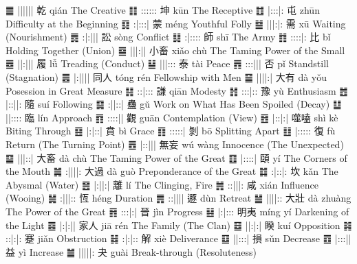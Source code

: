  {䷀} {||||||} {乾}   {qián}      {The Creative}
 {䷁} {::::::} {坤}   {kūn}       {The Receptive}
 {䷂} {|:::|:} {屯}   {zhūn}      {Difficulty at the Beginning}
 {䷃} {:|:::|} {蒙}   {méng}      {Youthful Folly}
 {䷄} {|||:|:} {需}   {xū}        {Waiting (Nourishment)}
 {䷅} {:|:|||} {訟}   {sòng}      {Conflict}
 {䷆} {:|::::} {師}   {shī}       {The Army}
 {䷇} {::::|:} {比}   {bǐ}        {Holding Together (Union)}
 {䷈} {|||:||} {小畜} {xiǎo chù}  {The Taming Power of the Small}
 {䷉} {||:|||} {履}   {lǚ}        {Treading (Conduct)}
 {䷊} {|||:::} {泰}   {tài}       {Peace}
 {䷋} {:::|||} {否}   {pǐ}        {Standstill (Stagnation)}
 {䷌} {|:||||} {同人} {tóng rén}  {Fellowship with Men}
 {䷍} {||||:|} {大有} {dà yǒu}    {Posession in Great Measure}
 {䷎} {::|:::} {謙}   {qiān}      {Modesty}
 {䷏} {:::|::} {豫}   {yù}        {Enthusiasm}
 {䷐} {|::||:} {隨}   {suí}       {Following}
 {䷑} {:||::|} {蠱}   {gŭ}        {Work on What Has Been Spoiled (Decay)}
 {䷒} {||::::} {臨}   {lín}       {Approach}
 {䷓} {::::||} {觀}   {guān}      {Contemplation (View)}
 {䷔} {|::|:|} {噬嗑} {shì kè}    {Biting Through}
 {䷕} {|:|::|} {賁}   {bì}        {Grace}
 {䷖} {:::::|} {剝}   {bō}        {Splitting Apart}
 {䷗} {|:::::} {復}   {fù}        {Return (The Turning Point)}
 {䷘} {|::|||} {無妄} {wú wàng}   {Innocence (The Unexpected)}
 {䷙} {|||::|} {大畜} {dà chù}    {The Taming Power of the Great}
 {䷚} {|::::|} {頤}   {yí}        {The Corners of the Mouth}
 {䷛} {:||||:} {大過} {dà guò}    {Preponderance of the Great}
 {䷜} {:|::|:} {坎}   {kǎn}       {The Abysmal (Water)}
 {䷝} {|:||:|} {離}   {lí}        {The Clinging, Fire}
 {䷞} {::|||:} {咸}   {xián}      {Influence (Wooing)}
 {䷟} {:|||::} {恆}   {héng}      {Duration}
 {䷠} {::||||} {遯}   {dùn}       {Retreat}
 {䷡} {||||::} {大壯} {dà zhuàng} {The Power of the Great}
 {䷢} {:::|:|} {晉}   {jìn}       {Progress}
 {䷣} {|:|:::} {明夷} {míng yí}   {Darkening of the Light}
 {䷤} {|:|:||} {家人} {jiā rén}   {The Family (The Clan)}
 {䷥} {||:|:|} {睽}   {kuí}       {Opposition}
 {䷦} {::|:|:} {蹇}   {jiǎn}      {Obstruction}
 {䷧} {:|:|::} {解}   {xiè}       {Deliverance}
 {䷨} {||:::|} {損}   {sǔn}       {Decrease}
 {䷩} {|:::||} {益}   {yì}        {Increase}
 {䷪} {|||||:} {夬}   {guài}      {Break-through (Resoluteness)}
